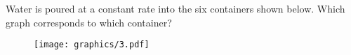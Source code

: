 \documentclass{ximera}
\begin{document}
\newpage

\begin{problem}
Water is poured at a constant rate into the six containers shown
below. Which graph corresponds to which container?

\begin{figure}[h]
\begin{center}
\texttt{[image: graphics/3.pdf]}
\end{center}
\end{figure}


\end{problem}
\end{document}
